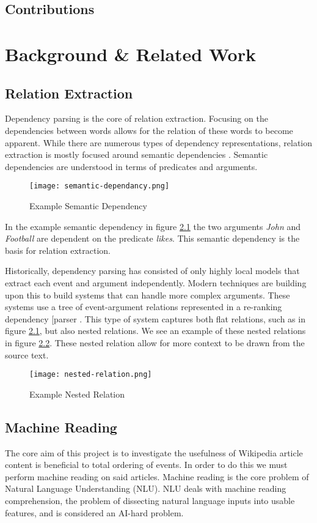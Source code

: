 \documentclass[bsc,frontabs,twoside,singlespacing,parskip,deptreport]{infthesis}     %
\begin{document}
\section{Contributions}

\chapter{Background \& Related Work}


\section{Relation Extraction}
Dependency parsing is the core of relation extraction. Focusing on the dependencies between words allows for the relation of these words to become apparent.
While there are numerous types of dependency representations, relation extraction is mostly focused around semantic dependencies \cite{mcclosky2011event}.
Semantic dependencies are understood in terms of predicates and arguments.
\begin{figure}[H]
  \centering
  \texttt{[image: semantic-dependancy.png]}
  \caption{Example Semantic Dependency}
  \label{fig:semantic-dependancy}
\end{figure}

In the example semantic dependency in figure \ref{fig:semantic-dependancy} the two arguments \textit{John} and \textit{Football} are dependent
on the predicate \textit{likes}. This semantic dependency is the basis for relation extraction.


Historically, dependency parsing has consisted of only highly local models that extract each event and argument independently.
Modern techniques are building upon this to build systems that can handle more complex arguments. These systems use a tree of
event-argument relations represented in a re-ranking dependency [parser \cite{mcclosky2011event}.
This type of system captures both flat relations, such as in figure \ref{fig:semantic-dependancy}, but also nested relations.
We see an example of these nested relations in figure \ref{fig:nested-relation}. These nested relation allow for more context to be drawn from
the source text.

\begin{figure}[H]
  \centering
  \texttt{[image: nested-relation.png]}
  \caption{Example Nested Relation}
  \label{fig:nested-relation}
\end{figure}


\section{Machine Reading}
The core aim of this project is to investigate the usefulness of Wikipedia article content is beneficial to total ordering of events.
In order to do this we must perform machine reading on said articles.
Machine reading is the core problem of Natural Language Understanding (NLU).
NLU deals with machine reading comprehension, the problem of dissecting natural language inputs into usable features,
and is considered an AI-hard problem.
\end{document}
